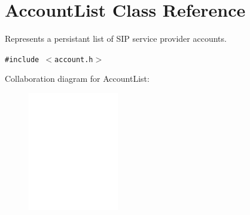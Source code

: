\hypertarget{classAccountList}{
\section{AccountList Class Reference}
\label{classAccountList}
}
Represents a persistant list of SIP service provider accounts.  


{\tt \#include $<$account.h$>$}

Collaboration diagram for AccountList:\nopagebreak
\begin{figure}[H]
\begin{center}
\leavevmode
\includegraphics[width=112pt]{classAccountList__coll__graph}
\end{center}
\end{figure}
